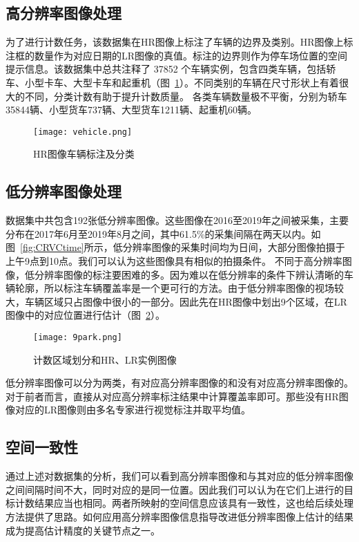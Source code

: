 \subsection{高分辨率图像处理}  
为了进行计数任务，该数据集在HR图像上标注了车辆的边界及类别。HR图像上标注框的数量作为对应日期的LR图像的真值。标注的边界则作为停车场位置的空间提示信息。该数据集中总共注释了 37852 个车辆实例，包含四类车辆，包括轿车、小型卡车、大型卡车和起重机（图~\ref{fig:vehicle}）。不同类别的车辆在尺寸形状上有着很大的不同，分类计数有助于提升计数质量。  各类车辆数量极不平衡，分别为轿车35844辆、小型货车737辆、大型货车1211辆、起重机60辆。 
\begin{figure}[h]
    \centering
    \texttt{[image: vehicle.png]}
    \caption{HR图像车辆标注及分类}
    \label{fig:vehicle}
\end{figure}

\subsection{低分辨率图像处理}  
数据集中共包含192张低分辨率图像。这些图像在2016至2019年之间被采集，主要分布在2017年6月至2019年8月之间，其中61.5\%的采集间隔在两天以内。如图~\ref{fig:CRVCtime}所示，低分辨率图像的采集时间均为日间，大部分图像拍摄于上午9点到10点。我们可以认为这些图像具有相似的拍摄条件。
不同于高分辨率图像，低分辨率图像的标注要困难的多。因为难以在低分辨率的条件下辨认清晰的车辆轮廓，所以标注车辆覆盖率是一个更可行的方法。由于低分辨率图像的视场较大，车辆区域只占图像中很小的一部分。因此先在HR图像中划出9个区域，在LR图像中的对应位置进行估计（图~\ref{fig:park}）。
\begin{figure}[ht]
    \centering
    \texttt{[image: 9park.png]}
    \caption{计数区域划分和HR、LR实例图像}
    \label{fig:park}
\end{figure}

低分辨率图像可以分为两类，有对应高分辨率图像的和没有对应高分辨率图像的。对于前者而言，直接从对应高分辨率标注结果中计算覆盖率即可。那些没有HR图像对应的LR图像则由多名专家进行视觉标注并取平均值。
\subsection{空间一致性}  
通过上述对数据集的分析，我们可以看到高分辨率图像和与其对应的低分辨率图像之间间隔时间不大，同时对应的是同一位置。因此我们可以认为在它们上进行的目标计数结果应当也相同。两者所映射的空间信息应该具有一致性，这也给后续处理方法提供了思路。如何应用高分辨率图像信息指导改进低分辨率图像上估计的结果成为提高估计精度的关键节点之一。
